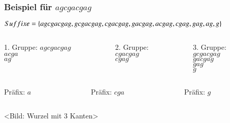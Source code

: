 \documentclass{beamer}
\begin{document}
\begin{frame}[t]
\frametitle{Beispiel für $agcgacgag$}
$Suffixe = \{agcgacgag, gcgacgag, cgacgag, gacgag, acgag, cgag, \newline gag, ag, g\}$
\medskip
\begin{columns}
    \begin{column}[t]{0.3\textwidth}
        1. Gruppe:  
        $agcgacgag$  \\
        $acga$      \\  
        $ag$         \\ 
    \end{column}
    \begin{column}[t]{0.3\textwidth}
        2. Gruppe:        \\
        $cgacgag$   \\
        $cgag$         \\
    \end{column}
    \begin{column}[t]{0.3\textwidth}
        3. Gruppe:      \\
        $gcgacgag$ \\
        $gacgag$     \\
        $gag$           \\
        $g$               \\
    \end{column}
\end{columns}
\medskip
\begin{columns}
    \begin{column}[t]{0.3\textwidth}
        Präfix: $a$
    \end{column}
    \begin{column}[t]{0.3\textwidth}
        Präfix: $cga$
    \end{column}
    \begin{column}[t]{0.3\textwidth}
        Präfix: $g$
    \end{column}
\end{columns}
\medskip
<Bild: Wurzel mit 3 Kanten>
\end{frame}

\end{document}
